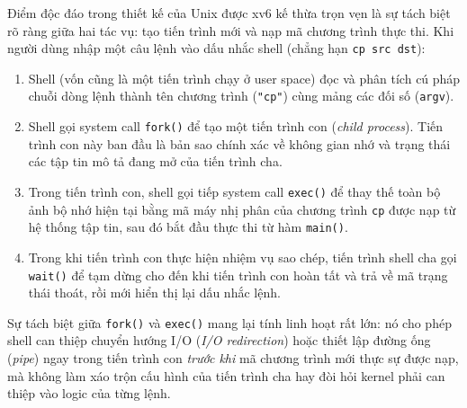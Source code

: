 \documentclass[12pt,a4paper]{article}
\begin{document}
Điểm độc đáo trong thiết kế của Unix được xv6 kế thừa trọn vẹn là sự tách biệt rõ ràng giữa hai tác vụ: tạo tiến trình mới và nạp mã chương trình thực thi. Khi người dùng nhập một câu lệnh vào dấu nhắc shell (chẳng hạn \texttt{cp src dst}):
\begin{enumerate}
  \item Shell (vốn cũng là một tiến trình chạy ở user space) đọc và phân tích cú pháp chuỗi dòng lệnh thành tên chương trình (\texttt{"cp"}) cùng mảng các đối số (\texttt{argv}).
  \item Shell gọi system call \texttt{fork()} để tạo một tiến trình con (\textit{child process}). Tiến trình con này ban đầu là bản sao chính xác về không gian nhớ và trạng thái các tập tin mô tả đang mở của tiến trình cha.
  \item Trong tiến trình con, shell gọi tiếp system call \texttt{exec()} để thay thế toàn bộ ảnh bộ nhớ hiện tại bằng mã máy nhị phân của chương trình \texttt{cp} được nạp từ hệ thống tập tin, sau đó bắt đầu thực thi từ hàm \texttt{main()}.
  \item Trong khi tiến trình con thực hiện nhiệm vụ sao chép, tiến trình shell cha gọi \texttt{wait()} để tạm dừng cho đến khi tiến trình con hoàn tất và trả về mã trạng thái thoát, rồi mới hiển thị lại dấu nhắc lệnh.
\end{enumerate}

Sự tách biệt giữa \texttt{fork()} và \texttt{exec()} mang lại tính linh hoạt rất lớn: nó cho phép shell can thiệp chuyển hướng I/O (\textit{I/O redirection}) hoặc thiết lập đường ống (\textit{pipe}) ngay trong tiến trình con \textit{trước khi} mã chương trình mới thực sự được nạp, mà không làm xáo trộn cấu hình của tiến trình cha hay đòi hỏi kernel phải can thiệp vào logic của từng lệnh.
\end{document}
